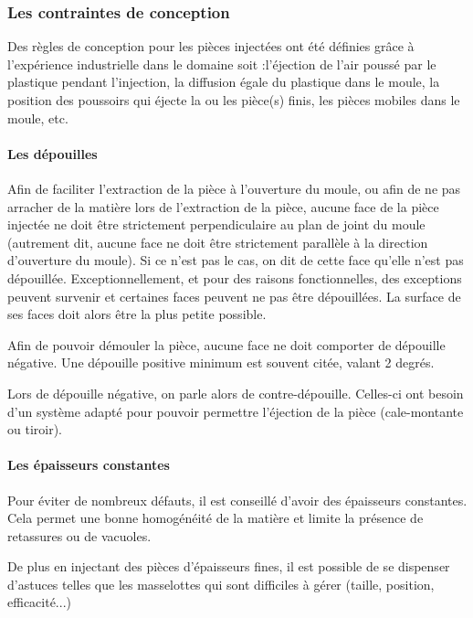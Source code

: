 \documentclass[11pt,oneside]{article}
\begin{document}
\subsubsection{Les contraintes de conception}
         Des  règles  de  conception  pour  les  pièces  injectées  ont  été 
définies  grâce  à 
l'expérience  industrielle  dans  le  domaine  soit :l'éjection  de  l'air 
poussé  par  le  plastique 
pendant l'injection, la diffusion égale du plastique dans le moule, la position
des poussoirs 
qui éjecte la ou les pièce(s) finis, les pièces mobiles dans le moule, etc. 
         
\paragraph{Les dépouilles}
         Afin  de  faciliter  l'extraction  de  la  pièce  à  l'ouverture  du 
moule,  ou  afin  de  ne  pas 
arracher  de  la  matière lors  de  l'extraction  de  la  pièce,  aucune  face 
de  la  pièce  injectée  ne 
doit être strictement perpendiculaire au plan de joint du moule (autrement dit,
aucune face 
ne doit être strictement parallèle à la direction d'ouverture du moule). Si ce
n'est pas le cas, 
on  dit  de  cette  face  qu'elle  n'est  pas  dépouillée.  Exceptionnellement, 
et  pour  des  raisons 
fonctionnelles,  des  exceptions  peuvent  survenir  et  certaines  faces 
peuvent  ne  pas  être 
dépouillées. La surface de ses faces doit alors être la plus petite possible. 

         Afin  de  pouvoir  démouler  la  pièce,  aucune  face  ne  doit 
comporter  de  dépouille 
négative. Une dépouille positive minimum est souvent citée, valant 2 degrés. 

         Lors  de  dépouille  négative,  on  parle  alors  de  contre-dépouille.
 Celles-ci  ont  besoin 
d'un système adapté pour pouvoir permettre l'éjection de la pièce (cale-montante
ou tiroir). 

\paragraph{Les épaisseurs constantes}

         Pour  éviter  de  nombreux  défauts,  il  est  conseillé  d'avoir  des 
épaisseurs  constantes. 
Cela permet une bonne homogénéité de la matière et limite la présence de
retassures ou de 
vacuoles. 

        De  plus  en  injectant  des  pièces  d'épaisseurs  fines,  il  est 
possible  de  se  dispenser 
d'astuces telles que les masselottes qui sont difficiles à gérer (taille,
position, efficacité...) 
\end{document}
